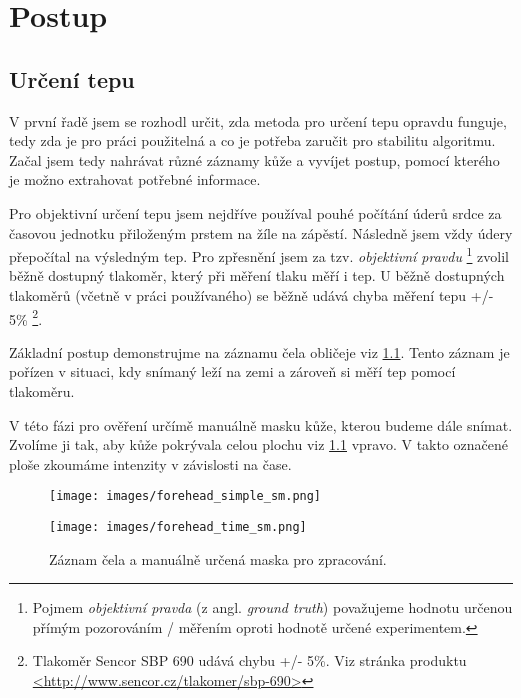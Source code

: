\documentclass[
  digital, %
  table,   %
%
  lof,     %
  lot,     %
]{fithesis3}
\begin{document}
\chapter{Postup}
\section{Určení tepu}
V první řadě jsem se rozhodl určit, zda metoda pro určení tepu opravdu funguje, tedy zda je pro práci použitelná a co je potřeba zaručit pro stabilitu algoritmu. Začal jsem tedy nahrávat různé záznamy kůže a vyvíjet postup, pomocí kterého je možno extrahovat potřebné informace.

Pro objektivní určení tepu jsem nejdříve používal pouhé počítání úderů srdce za časovou jednotku přiloženým prstem na žíle na zápěstí. Následně jsem vždy údery přepočítal na výsledným tep. Pro zpřesnění jsem za tzv. \emph{objektivní pravdu}
\footnote{Pojmem \emph{objektivní pravda} (z angl. \emph{ground truth}) považujeme hodnotu určenou přímým pozorováním / měřením oproti hodnotě určené experimentem. }
zvolil běžně dostupný tlakoměr, který při měření tlaku měří i tep. U běžně dostupných tlakoměrů (včetně v práci používaného) se běžně udává chyba měření tepu +/- 5\% \footnote{Tlakoměr Sencor SBP 690 udává chybu +/- 5\%. Viz stránka produktu \url{<http://www.sencor.cz/tlakomer/sbp-690>}}.

Základní postup demonstrujme na záznamu čela obličeje viz \ref{fig:initial-proof-forehead}. Tento záznam je pořízen v situaci, kdy snímaný leží na zemi a zároveň si měří tep pomocí tlakoměru.

V této fázi pro ověření určímě manuálně masku kůže, kterou budeme dále snímat. Zvolíme ji tak, aby kůže pokrývala celou plochu viz \ref{fig:initial-proof-forehead} vpravo. V takto označené ploše zkoumáme intenzity v závislosti na čase.



\begin{figure}
  \begin{minipage}{.5\textwidth}
    \texttt{[image: images/forehead\_simple\_sm.png]}
  \end{minipage}
  \begin{minipage}{.5\textwidth}
    \texttt{[image: images/forehead\_time\_sm.png]}
  \end{minipage}
  \caption{Záznam čela a manuálně určená maska pro zpracování.}
  \label{fig:initial-proof-forehead}
\end{figure}
\end{document}
